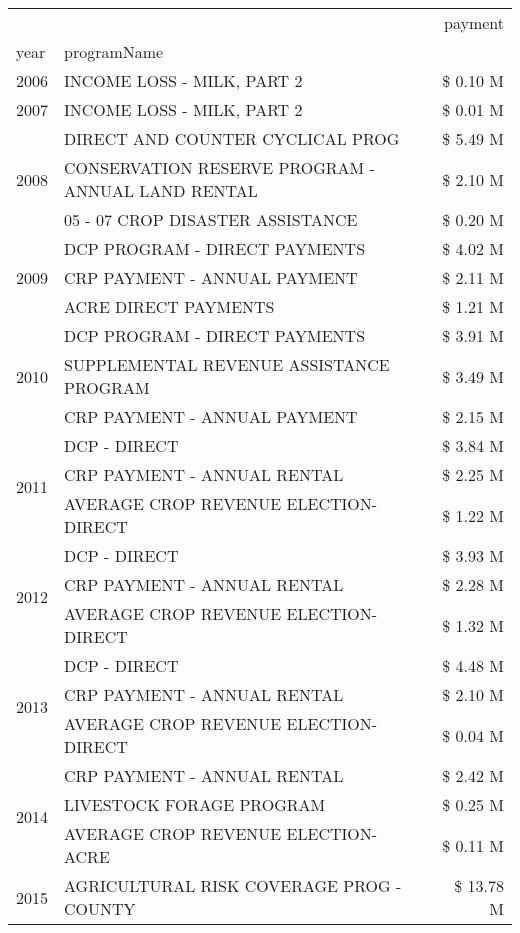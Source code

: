 \begin{tabular}{llr}
\toprule
 &  & payment \\
year & programName &  \\
\midrule
2006 & INCOME LOSS - MILK, PART 2 & \$ 0.10 M \\
\cline{1-3}
2007 & INCOME LOSS - MILK, PART 2 & \$ 0.01 M \\
\cline{1-3}
\multirow[t]{3}{*}{2008} & DIRECT AND COUNTER CYCLICAL PROG & \$ 5.49 M \\
 & CONSERVATION RESERVE PROGRAM - ANNUAL LAND RENTAL & \$ 2.10 M \\
 & 05 - 07 CROP DISASTER ASSISTANCE & \$ 0.20 M \\
\cline{1-3}
\multirow[t]{3}{*}{2009} & DCP PROGRAM - DIRECT PAYMENTS & \$ 4.02 M \\
 & CRP PAYMENT - ANNUAL PAYMENT & \$ 2.11 M \\
 & ACRE DIRECT PAYMENTS & \$ 1.21 M \\
\cline{1-3}
\multirow[t]{3}{*}{2010} & DCP PROGRAM - DIRECT PAYMENTS & \$ 3.91 M \\
 & SUPPLEMENTAL REVENUE ASSISTANCE PROGRAM & \$ 3.49 M \\
 & CRP PAYMENT - ANNUAL PAYMENT & \$ 2.15 M \\
\cline{1-3}
\multirow[t]{3}{*}{2011} & DCP - DIRECT & \$ 3.84 M \\
 & CRP PAYMENT - ANNUAL RENTAL & \$ 2.25 M \\
 & AVERAGE CROP REVENUE ELECTION-DIRECT & \$ 1.22 M \\
\cline{1-3}
\multirow[t]{3}{*}{2012} & DCP - DIRECT & \$ 3.93 M \\
 & CRP PAYMENT - ANNUAL RENTAL & \$ 2.28 M \\
 & AVERAGE CROP REVENUE ELECTION-DIRECT & \$ 1.32 M \\
\cline{1-3}
\multirow[t]{3}{*}{2013} & DCP - DIRECT & \$ 4.48 M \\
 & CRP PAYMENT - ANNUAL RENTAL & \$ 2.10 M \\
 & AVERAGE CROP REVENUE ELECTION-DIRECT & \$ 0.04 M \\
\cline{1-3}
\multirow[t]{3}{*}{2014} & CRP PAYMENT - ANNUAL RENTAL & \$ 2.42 M \\
 & LIVESTOCK FORAGE PROGRAM & \$ 0.25 M \\
 & AVERAGE CROP REVENUE ELECTION-ACRE & \$ 0.11 M \\
\cline{1-3}
\multirow[t]{3}{*}{2015} & AGRICULTURAL RISK COVERAGE PROG - COUNTY & \$ 13.78 M \\

\end{tabular}
